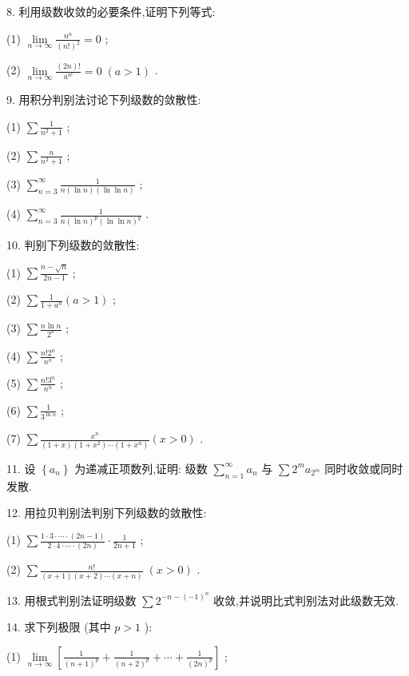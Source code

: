 8. 利用级数收敛的必要条件,证明下列等式:

(1) \(\mathop{\lim }\limits_{{n \rightarrow  \infty }}\frac{{n}^{n}}{{\left( n!\right) }^{2}} = 0\) ;

(2) \(\mathop{\lim }\limits_{{n \rightarrow  \infty }}\frac{\left( {2n}\right) !}{{a}^{n!}} = 0\;\left( {a > 1}\right)\) .

9. 用积分判别法讨论下列级数的敛散性:

(1) \(\sum \frac{1}{{n}^{2} + 1}\) ;

(2) \(\sum \frac{n}{{n}^{2} + 1}\) ;

(3) \(\mathop{\sum }\limits_{{n = 3}}^{\infty }\frac{1}{n\left( {\ln n}\right) \left( {\ln \ln n}\right) }\) ;

(4) \(\mathop{\sum }\limits_{{n = 3}}^{\infty }\frac{1}{n{\left( \ln n\right) }^{p}{\left( \ln \ln n\right) }^{q}}\) .

10. 判别下列级数的敛散性:

(1) \(\sum \frac{n - \sqrt{n}}{{2n} - 1}\) ;

(2) \(\sum \frac{1}{1 + {a}^{n}}\left( {a > 1}\right)\) ;

(3) \(\sum \frac{n\ln n}{{2}^{n}}\) ;

(4) \(\sum \frac{n!{2}^{n}}{{n}^{n}}\) ;

(5) \(\sum \frac{n!{3}^{n}}{{n}^{n}}\) ;

(6) \(\sum \frac{1}{{3}^{\ln n}}\) ;

(7) \(\sum \frac{{x}^{n}}{\left( {1 + x}\right) \left( {1 + {x}^{2}}\right) \cdots \left( {1 + {x}^{n}}\right) }\left( {x > 0}\right)\) .

11. 设 \(\left\{  {a}_{n}\right\}\) 为递减正项数列,证明: 级数 \(\mathop{\sum }\limits_{{n = 1}}^{\infty }{a}_{n}\) 与 \(\sum {2}^{m}{a}_{{2}^{m}}\) 同时收敛或同时发散.

12. 用拉贝判别法判别下列级数的敛散性:

(1) \(\sum \frac{1 \cdot  3 \cdot  \cdots  \cdot  \left( {{2n} - 1}\right) }{2 \cdot  4 \cdot  \cdots  \cdot  \left( {2n}\right) } \cdot  \frac{1}{{2n} + 1}\) ;

(2) \(\sum \frac{n!}{\left( {x + 1}\right) \left( {x + 2}\right) \cdots \left( {x + n}\right) }\;\left( {x > 0}\right)\) .

13. 用根式判别法证明级数 \(\sum {2}^{-n - {\left( -1\right) }^{n}}\) 收敛,并说明比式判别法对此级数无效.

14. 求下列极限 (其中 \(p > 1\) ):

(1) \(\mathop{\lim }\limits_{{n \rightarrow  \infty }}\left\lbrack  {\frac{1}{{\left( n + 1\right) }^{p}} + \frac{1}{{\left( n + 2\right) }^{p}} + \cdots  + \frac{1}{{\left( 2n\right) }^{p}}}\right\rbrack\) ;

